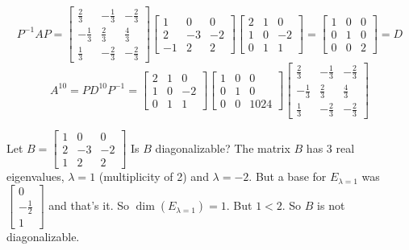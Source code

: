 \documentclass[12pt]{article}
\begin{document}
\begin{example}
$$ P^{-1}AP = \begin{bmatrix} \frac{2}{3} & -\frac{1}{3} & -\frac{2}{3} \\ -\frac{1}{3} & \frac{2}{3} & \frac{4}{3} \\ \frac{1}{3} & -\frac{2}{3} & -\frac{2}{3} \end{bmatrix}\begin{bmatrix} 1 & 0 & 0 \\ 2 & -3 & -2 \\ -1 & 2 & 2 \end{bmatrix}\begin{bmatrix} 2 & 1 & 0 \\ 1 & 0 & -2 \\ 0 & 1 & 1 \end{bmatrix} = \begin{bmatrix} 1 & 0 & 0 \\ 0 & 1 & 0 \\ 0 & 0 & 2 \end{bmatrix} = D $$ $$ A^{10} = PD^{10}P^{-1} =\begin{bmatrix} 2 & 1 & 0 \\ 1 & 0 & -2 \\ 0 & 1 & 1 \end{bmatrix}\begin{bmatrix} 1 & 0 & 0 \\ 0 & 1 & 0 \\ 0 & 0 & 1024 \end{bmatrix}\begin{bmatrix} \frac{2}{3} & -\frac{1}{3} & -\frac{2}{3} \\ -\frac{1}{3} & \frac{2}{3} & \frac{4}{3} \\ \frac{1}{3} & -\frac{2}{3} & -\frac{2}{3} \end{bmatrix} $$ \end{example} 
\begin{example} Let $B = \begin{bmatrix} 1 & 0 & 0 \\ 2 & -3 & -2 \\ 1 & 2 & 2 \end{bmatrix}$ Is $B$ diagonalizable? \newline The matrix $B$ has 3 real eigenvalues, $\lambda = 1$ (multiplicity of 2) and $\lambda = -2$. But a base for $E_{\lambda = 1}$ was $\begin{bmatrix} 0 \\ -\frac{1}{2} \\ 1 \end{bmatrix}$ and that's it. So $\dim(E_{\lambda = 1}) = 1$. But $ 1 < 2 $. So $B$ is not diagonalizable. \end{example} 
\end{document}
